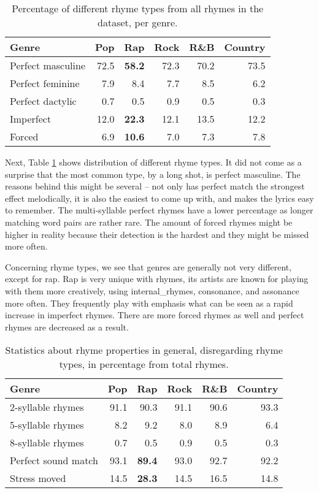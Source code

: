 \begin{table}[h!]
	\centering
	\begin{tabular}{l | r r r r r} 	
		Genre & 			Pop & 		Rap & 		Rock & 		R\&B & 		Country\\ 
		\midrule
		Perfect masculine &	72.5& 	\textbf{58.2}& 	72.3& 	70.2& 	73.5 \\
		Perfect feminine &	7.9&		8.4& 		7.7& 		8.5& 		6.2 \\
		Perfect dactylic & 	0.7 &		0.5 & 	0.9 &		0.5& 		0.3 \\  
		Imperfect & 		12.0& 	\textbf{22.3} & 	12.1 & 	13.5 & 	12.2 \\
		Forced &  			6.9 & 	\textbf{10.6} & 	7.0 & 	7.3 &		7.8 \\
	\end{tabular}
	\caption{Percentage of different rhyme types from all rhymes in the dataset, per genre.} 
	\label{rhyme_types_perc}
\end{table}

Next, Table \ref{rhyme_types_perc} shows distribution of different rhyme types. It did not come as a surprise that the most common type, by a long shot, is perfect masculine. The reasons behind this might be several -- not only has perfect match the strongest effect melodically, it is also the easiest to come up with, and makes the lyrics easy to remember. The multi-syllable perfect rhymes have a lower percentage as longer matching word pairs are rather rare. The amount of forced rhymes might be higher in reality because their detection is the hardest and they might be missed more often.

Concerning rhyme types, we see that genres are generally not very different, except for rap. Rap is very unique with rhymes, its artists are known for playing with them more creatively, using \gls{internal_rhyme}s, consonance, and assonance more often. They frequently play with emphasis what can be seen as a rapid increase in imperfect rhymes. There are more forced rhymes as well and perfect rhymes are decreased as a result.

\begin{table}[h!]
	\centering
	\begin{tabular}{l | r r r r r} 	
		Genre & 			Pop & 		Rap & 		Rock & 		R\&B & 		Country\\ 
		\midrule
		2-syllable rhymes & 91.1& 90.3& 91.1& 90.6 & 93.3\\
		5-syllable rhymes& 8.2& 9.2& 8.0& 8.9& 6.4  \\
		8-syllable rhymes& 0.7& 0.5& 0.9& 0.5& 0.3 \\
		Perfect sound match & 93.1&\textbf{ 89.4}& 93.0& 92.7& 92.2  \\
		Stress moved & 14.5& \textbf{28.3}& 14.5& 16.5& 14.8 \\
		
	\end{tabular}
	\caption{Statistics about rhyme properties in general, disregarding rhyme types, in percentage from total rhymes.} 
	\label{rhyme_stats}
\end{table}

